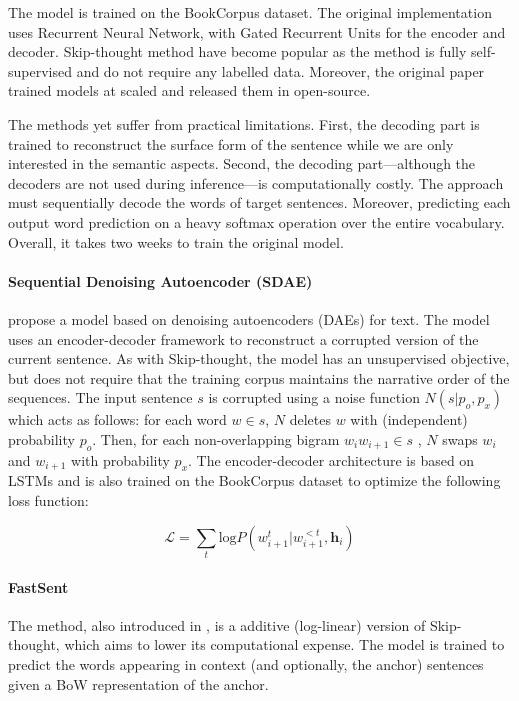 The model is trained on the BookCorpus dataset. The original implementation uses Recurrent Neural Network, with Gated Recurrent Units \parencite{cho_14} for the encoder and decoder. Skip-thought method have become popular as the method is fully self-supervised and do not require any labelled data. Moreover, the original paper trained models at scaled and released them in open-source. 

The methods yet suffer from practical limitations. First, the decoding part is trained to reconstruct the surface form of the sentence while we are only interested in the semantic aspects. Second, the decoding part—although the decoders are not used during inference—is computationally costly. The approach must sequentially decode the words of target sentences. Moreover, predicting each output word prediction on a heavy softmax operation over the entire vocabulary. Overall, it takes two weeks to train the original model. 

\paragraph{Sequential Denoising Autoencoder (SDAE)} \textcite{hill_16} propose a model based on denoising autoencoders (DAEs) for text. The model uses an encoder-decoder framework to reconstruct a corrupted version of the current sentence. As with Skip-thought, the model has an unsupervised objective, but does not require that the training corpus maintains the narrative order of the sequences. The input sentence $s$ is corrupted using a noise function $N(s|p_o, p_x)$ which acts as follows: for each word $w \in s$, $N$ deletes $w$ with (independent) probability $p_o$. Then, for each non-overlapping bigram $w_iw_{i+1} \in s$ , $N$ swaps $w_i$ and $w_{i+1}$ with probability $p_x$. The encoder-decoder architecture is based on LSTMs and is also trained on the BookCorpus dataset to optimize the following loss function:

\begin{equation*}
    \mathcal{L} = \sum_t \text{log} P(w_{i+1}^t | w_{i+1}^{<t}, \textbf{h}_i)
\end{equation*}

\paragraph{FastSent} The method, also introduced in \textcite{hill_16}, is a additive (log-linear) version of Skip-thought, which aims to lower its computational expense. The model is trained to predict the words appearing in context (and optionally, the anchor) sentences given a BoW representation of the anchor.

